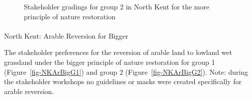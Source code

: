 \documentclass[
  12pt,
  letterpaper,
  DIV=11,
  numbers=noendperiod]{scrartcl}
\makeatletter
\let\oldparagraph\paragraph
\renewcommand{\paragraph}{
    \@ifstar
      \xxxParagraphStar
      \xxxParagraphNoStar
  }
\newcommand{\xxxParagraphStar}[1]{\oldparagraph*{#1}\mbox{}}
\newcommand{\xxxParagraphNoStar}[1]{\oldparagraph{#1}\mbox{}}
\makeatother
\begin{document}
\begin{figure}[H]


\caption{\label{fig-NKMoreG2}Stakeholder gradings for group 2 in North
Kent for the more principle of nature restoration}

\end{figure}%

\newpage{}

\paragraph{North Kent: Arable Reversion for
Bigger}\label{north-kent-arable-reversion-for-bigger}

The stakeholder preferences for the reversion of arable land to lowland
wet grassland under the bigger principle of nature restoration for group
1 (Figure~\ref{fig-NKArBigG1}) and group 2 (Figure~\ref{fig-NKArBigG2}).
Note: during the stakeholder workshops no guidelines or masks were
created specifically for arable reversion.
\end{document}

